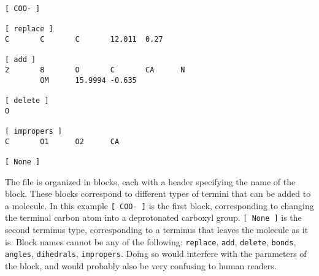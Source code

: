 {\small
\begin{verbatim}
[ COO- ]

[ replace ]
C       C       C       12.011  0.27

[ add ]
2       8       O       C       CA      N
        OM      15.9994 -0.635

[ delete ]
O

[ impropers ]
C       O1      O2      CA

[ None ]
\end{verbatim}}

The file is organized in blocks, each with a header specifying the
name of the block. These blocks correspond to different types of
termini that can be added to a molecule. In this example {\tt [~COO-~]}
is the first block, corresponding to changing the terminal carbon
atom into a deprotonated carboxyl group. {\tt [~None~]} is the
second terminus type, corresponding to a terminus that leaves
the molecule as it is. Block names cannot be any of the following:
{\tt replace}, {\tt add}, {\tt delete}, {\tt bonds}, {\tt angles},
{\tt dihedrals}, {\tt impropers}.  Doing so would interfere with
the parameters of the block, and would probably also be very confusing
to human readers.

